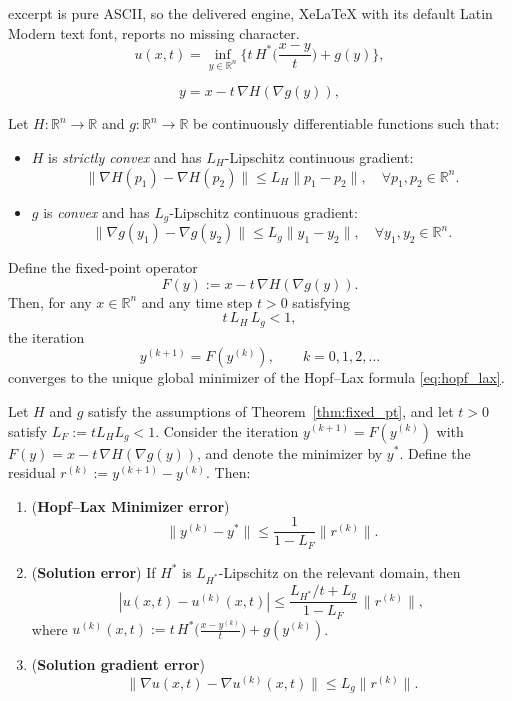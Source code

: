 \documentclass[10pt,a4paper]{amsart}
\begin{document}
excerpt is pure ASCII, so the delivered engine, XeLaTeX with its default Latin Modern text font, reports no missing character.
\begin{equation}\label{eq:hopf_lax}
    u(x,t) = \inf_{y \in \mathbb{R}^n} \Big\{ t\,H^\ast\Big(\frac{x-y}{t}\Big) + g(y) \Big\},
\end{equation}

\begin{equation}\label{eq:fixed_pts}
    y = x - t\, \nabla H(\nabla g(y)),
\end{equation}

\begin{theorem}\label{thm:fixed_pt}
Let \( H: \mathbb{R}^n \to \mathbb{R} \) and \( g: \mathbb{R}^n \to \mathbb{R} \) be continuously differentiable functions such that:
\begin{itemize}
    \item \( H \) is \emph{strictly convex} and has \( L_H \)-Lipschitz continuous gradient:
    \[
    \|\nabla H(p_1) - \nabla H(p_2)\| \leq L_H \|p_1 - p_2\|, \quad \forall p_1, p_2 \in \mathbb{R}^n.
    \]
    \item \( g \) is \emph{convex} and has \( L_g \)-Lipschitz continuous gradient:
    \[
    \|\nabla g(y_1) - \nabla g(y_2)\| \leq L_g \|y_1 - y_2\|, \quad \forall y_1, y_2 \in \mathbb{R}^n.
    \]
\end{itemize}
Define the fixed-point operator
\[
    F(y) := x - t\, \nabla H(\nabla g(y)).
\]
Then, for any \(x \in \mathbb{R}^n\) and any time step \(t>0\) satisfying
\[
    t\, L_H\, L_g < 1,
\]
the iteration
\[
    y^{(k+1)} = F(y^{(k)}), \qquad k = 0,1,2,\dots
\]
converges to the unique global minimizer of the Hopf--Lax formula \eqref{eq:hopf_lax}.

\end{theorem}

\begin{theorem}\label{thm:residual_error}
Let \(H\) and \(g\) satisfy the assumptions of Theorem~\ref{thm:fixed_pt}, and let \(t>0\) satisfy \(L_F := t L_H L_g < 1\).  
Consider the iteration \(y^{(k+1)} = F(y^{(k)})\) with \(F(y) = x - t\,\nabla H(\nabla g(y))\),
and denote the minimizer by \(y^\ast\). Define the residual \(r^{(k)} := y^{(k+1)} - y^{(k)}\).
Then:
\begin{enumerate}
    \item (\textbf{Hopf--Lax Minimizer error})
    \[
    \|y^{(k)} - y^\ast\| \le \frac{1}{1 - L_F} \|r^{(k)}\|.
    \]
    \item (\textbf{Solution error})  
    If \(H^\ast\) is \(L_{H^\ast}\)-Lipschitz on the relevant domain, then
    \[
    |u(x,t) - u^{(k)}(x,t)| \le \frac{L_{H^\ast}/t + L_g}{1 - L_F}\, \|r^{(k)}\|,
    \]
    where \(u^{(k)}(x,t) := t\, H^\ast\!\big(\frac{x - y^{(k)}}{t}\big) + g(y^{(k)})\).
    \item (\textbf{Solution gradient error})  
    \[
    \|\nabla u(x,t) - \nabla u^{(k)}(x,t)\| 
\le L_g\| r^{(k)} \|.
    \]
\end{enumerate}
\end{theorem}
\end{document}
